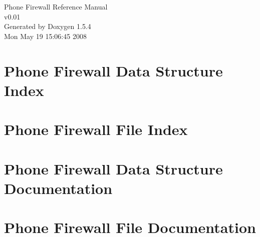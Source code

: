 \documentclass[a4paper]{book}
\begin{document}
\begin{titlepage}
\vspace*{7cm}
\begin{center}
{\Large Phone Firewall Reference Manual\\[1ex]\large v0.01 }\\
\vspace*{1cm}
{\large Generated by Doxygen 1.5.4}\\
\vspace*{0.5cm}
{\small Mon May 19 15:06:45 2008}\\
\end{center}
\end{titlepage}
\clearemptydoublepage
{}
\tableofcontents
\clearemptydoublepage
{}
\chapter{Phone Firewall Data Structure Index}

\chapter{Phone Firewall File Index}

\chapter{Phone Firewall Data Structure Documentation}

\chapter{Phone Firewall File Documentation}


\printindex
\end{document}
